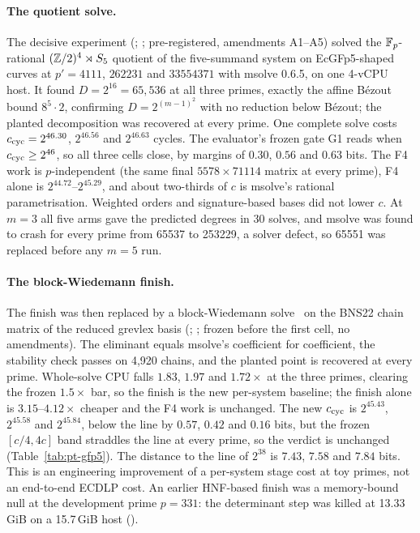 \paragraph{The quotient solve.} The decisive experiment
(; ;
pre-registered, amendments A1--A5) solved the $\mathbb{F}_p$-rational
$(\mathbb{Z}/2)^4\rtimes S_5$ quotient of the five-summand system on EcGFp5-shaped
curves at $p'=4111$, $262231$ and $33554371$ with msolve 0.6.5, on one
4-vCPU host. It found $D=2^{16}=65{,}536$ at all three primes, exactly the
affine B\'ezout bound $8^5\cdot2$, confirming $D=2^{(m-1)^2}$ with no
reduction below B\'ezout; the planted decomposition was recovered at every
prime. One complete solve costs $c_{\rm cyc}=2^{46.30}$, $2^{46.56}$ and
$2^{46.63}$ cycles. The evaluator's frozen gate G1 reads  when
$c_{\rm cyc}\ge2^{46}$, so all three cells close, by margins of $0.30$,
$0.56$ and $0.63$ bits. The F4 work is $p$-independent (the same final
$5578\times71114$ matrix at every prime), F4 alone is $2^{44.72}$--$2^{45.29}$,
and about two-thirds of $c$ is msolve's rational parametrisation. Weighted
orders and signature-based bases did not lower $c$. At $m=3$ all five arms
gave the predicted degrees in 30 solves, and msolve was found to crash for
every prime from 65537 to 253229, a solver defect, so 65551 was replaced
before any $m=5$ run.

\paragraph{The block-Wiedemann finish.} The finish was then replaced by a
block-Wiedemann solve~\cite{coppersmith1994} on the BNS22 chain matrix of the
reduced grevlex basis (;
; frozen before the first cell,
no amendments). The eliminant equals msolve's coefficient for coefficient,
the stability check passes on 4{,}920 chains, and the planted point is
recovered at every prime. Whole-solve CPU falls $1.83$, $1.97$ and
$1.72\times$ at the three primes, clearing the frozen $1.5\times$ bar, so the
finish is the new per-system baseline; the finish alone is $3.15$--$4.12\times$
cheaper and the F4 work is unchanged. The new $c_{\rm cyc}$ is $2^{45.43}$,
$2^{45.58}$ and $2^{45.84}$, below the  line by $0.57$, $0.42$ and
$0.16$ bits, but the frozen $[c/4,4c]$ band straddles the line at every
prime, so the verdict is unchanged (Table~\ref{tab:pt-gfp5}). The distance to the  line
of $2^{38}$ is $7.43$, $7.58$ and $7.84$ bits. This is an engineering
improvement of a per-system stage cost at toy primes, not an end-to-end
ECDLP cost. An earlier HNF-based finish was a memory-bound null at the
development prime $p=331$: the determinant step was killed at
13.33\,GiB on a 15.7\,GiB host
().

